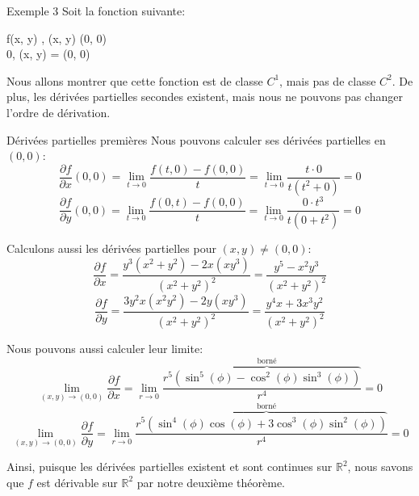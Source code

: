 \documentclass[a4paper]{article}
\begin{document}
\begin{parag}{Exemple 3}
    Soit la fonction suivante:
    \begin{functionbypart}{f\left(x, y\right)}
        , \mathspace \left(x, y\right) \neq \left(0, 0\right) \\
        0, \mathspace \left(x, y\right) = \left(0, 0\right)
    \end{functionbypart}

    Nous allons montrer que cette fonction est de classe $C^1$, mais pas de classe $C^2$. De plus, les dérivées partielles secondes existent, mais nous ne pouvons pas changer l'ordre de dérivation.

    \begin{subparag}{Dérivées partielles premières}
        Nous pouvons calculer ses dérivées partielles en $\left(0, 0\right)$:
        \[\frac{\partial f}{\partial x}\left(0, 0\right) = \lim_{t \to 0} \frac{f\left(t, 0\right) - f\left(0, 0\right)}{t} = \lim_{t \to 0} \frac{t\cdot 0}{t\left(t^2 + 0\right)} = 0\]
        \[\frac{\partial f}{\partial y}\left(0, 0\right) = \lim_{t \to 0} \frac{f\left(0, t\right) - f\left(0, 0\right)}{t} = \lim_{t \to 0} \frac{0\cdot t^3}{t\left(0 + t^2\right)} = 0\]

        Calculons aussi les dérivées partielles pour $\left(x, y\right) \neq \left(0, 0\right)$:
        \[\frac{\partial f}{\partial x} = \frac{y^3 \left(x^2 + y^2\right) - 2x\left(xy^3\right)}{\left(x^2+ y^2\right)^2} = \frac{y^5 -x^2 y^3}{\left(x^2 + y^2\right)^2}\]
        \[\frac{\partial f}{\partial y} = \frac{3 y^2 x\left(x^2 y^2\right) - 2y\left(x y^3\right)}{\left(x^2 + y^2\right)^2} = \frac{y^4 x + 3x^3 y^2}{\left(x^2 + y^2\right)^2}\]


        Nous pouvons aussi calculer leur limite:
        \[\lim_{\left(x, y\right) \to \left(0, 0\right)}  \frac{\partial f}{\partial x} = \lim_{r \to 0} \frac{r^{5} \overbrace{\left(\sin^5\left(\phi\right) - \cos^2\left(\phi\right) \sin^3\left(\phi\right)\right)}^{\text{borné}}}{r^4} = 0\]
        \[\lim_{\left(x, y\right) \to \left(0, 0\right)} \frac{\partial f}{\partial y} = \lim_{r \to 0} \frac{r^5 \overbrace{\left(\sin^4\left(\phi\right) \cos\left(\phi\right) + 3\cos^3\left(\phi\right) \sin^2\left(\phi\right)\right)}^{\text{borné}}}{r^4} = 0\]

        Ainsi, puisque les dérivées partielles existent et sont continues sur $\mathbb{R}^2$, nous savons que $f$ est dérivable sur $\mathbb{R}^2$ par notre deuxième théorème.
    \end{subparag}


\end{parag}
\end{document}
